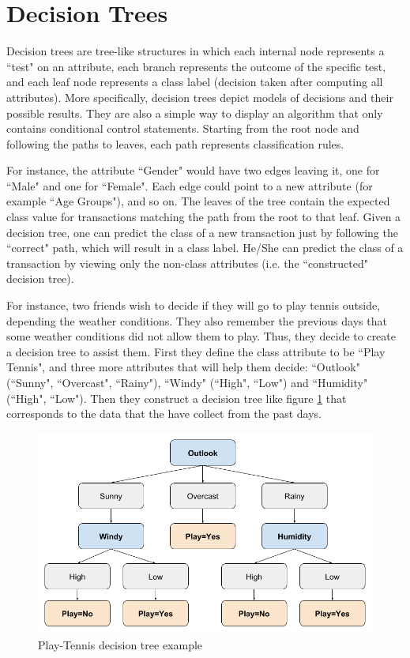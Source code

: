 \section{Decision Trees}\label{s:decision-trees}

Decision trees are tree-like structures in which each internal node represents a ``test" on an attribute, each branch represents the outcome of the specific test, and each leaf node represents a class label (decision taken after computing all attributes).
More specifically, decision trees depict models of decisions and their possible results.
They are also a simple way to display an algorithm that only contains conditional control statements.
Starting from the root node and following the paths to leaves, each path represents classification rules.

For instance, the attribute ``Gender" would have two edges leaving it, one for ``Male" and
one for ``Female".
Each edge could point to a new attribute (for example ``Age Groups"), and so on.
The leaves of the tree contain the expected class value for transactions matching the path from the root to that leaf.
Given a decision tree, one can predict the class of a new transaction just by following the ``correct" path, which will result in a class label.
He/She can predict the class of a transaction by viewing only the non-class attributes (i.e. the ``constructed" decision tree).

For instance, two friends wish to decide if they will go to play tennis outside, depending the weather conditions.
They also remember the previous days that some weather conditions did not allow them to play.
Thus, they decide to create a decision tree to assist them.
First they define the class attribute to be ``Play Tennis", and three more attributes that will help them decide: ``Outlook" (``Sunny", ``Overcast", ``Rainy"), ``Windy" (``High", ``Low") and ``Humidity" (``High", ``Low").
Then they construct a decision tree like figure \ref{f:outlook} that corresponds to the data that the have collect from the past days.

\begin{figure}[t]
  \centering
  \includegraphics[width=0.8\linewidth]{figures/outlook.png}
  \caption{Play-Tennis decision tree example}\label{f:outlook}
\end{figure}

